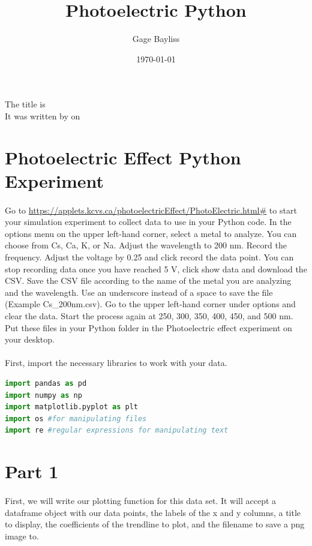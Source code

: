 \documentclass{journal}
\title{Photoelectric Python}
\author{Gage Bayliss}
\date{\today}
\begin{document}
\fancyhead[L]{\@title}
\fancyfoot[L]{\@author}

\makeatletter
\begin{titlepage}

The title is \@title\\
It was written by \@author\space on \@date

\end{titlepage}
\makeatother

\section*{Photoelectric Effect Python Experiment}


\paragraph{}
Go to \url{https://applets.kcvs.ca/photoelectricEffect/PhotoElectric.html#} to start your simulation experiment to collect data to use in your Python code. In the options menu on the upper left-hand corner, select a metal to analyze.  You can choose from Cs, Ca, K, or Na. Adjust the wavelength to 200 nm.  Record the frequency.  Adjust the voltage by 0.25 and click record the data point.  You can stop recording data once you have reached 5 V, click show data and download the CSV.  Save the CSV file according to the name of the metal you are analyzing and the wavelength.  Use an underscore instead of a space to save the file (Example Cs\_200nm.csv). Go to the upper left-hand corner under options and clear the data.  Start the process again at 250, 300, 350, 400, 450, and 500 nm.    Put these files in your Python folder in the Photoelectric effect experiment on your desktop.

\paragraph{}
First, import the necessary libraries to work with your data.
\begin{lstlisting}[language=python]
import pandas as pd
import numpy as np
import matplotlib.pyplot as plt
import os #for manipulating files
import re #regular expressions for manipulating text
\end{lstlisting}

\section*{Part 1}
\paragraph{}
First, we will write our plotting function for this data set. It will accept a dataframe object with our data points, the labels of the x and y columns, a title to display, the coefficients of the trendline to plot, and the filename to save a png image to. 
\end{document}
